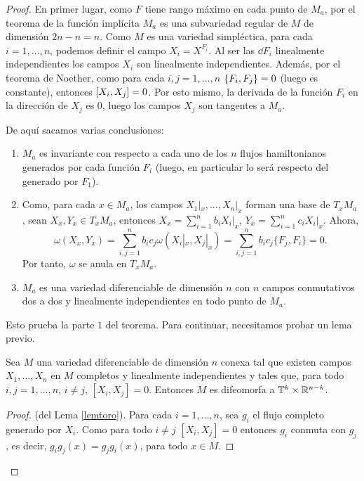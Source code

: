  \begin{proof}
  En primer lugar, como $F$ tiene rango máximo en cada punto de $M_a$, por el teorema de la función implícita $M_a$ es una subvariedad regular de $M$ de dimensión $2n-n=n$. 
  Como $M$ es una variedad simpléctica, para cada $i=1,\dots,n$, podemos definir el campo $X_i=X^{F_i}$. Al ser las $\dd F_i$ linealmente independientes los campos $X_i$ son linealmente independientes. Además, por el teorema de Noether, como para cada $i,j= 1,\dots,n$ $\left\lbrace F_i,F_j\right\rbrace=0$ (luego es constante), entonces $\left[X_i,X_j\right]=0$. Por esto mismo, la derivada de la función $F_i$ en la dirección de $X_j$ es 0, luego los campos $X_j$ son tangentes a $M_a$.

  De aquí sacamos varias conclusiones:
  \begin{enumerate}
    \item $M_a$ es invariante con respecto a cada uno de los $n$ flujos hamiltonianos generados por cada función $F_i$ (luego, en particular lo será respecto del generado por $F_1$).
    \item Como, para cada $x \in M_a$, los campos $X_1|_x,\dots, X_n|_x$ forman una base de $T_x M_a$, sean $X_x, Y_x \in T_x M_a$, entonces $X_x = \sum_{i=1}^n b_i X_i|_x$, $Y_x=\sum_{i=1}^n c_i X_i|_x$. Ahora,
      \[
	\omega(X_x,Y_x)= \sum_{i,j=1}^n b_i c_j \omega(X_i|_x,X_j|_x) = \sum_{i,j=1}^n b_i c_j \{F_j,F_i\} = 0.
      \]
      Por tanto, $\omega$ se anula en $T_x M_a$. 
    \item $M_a$ es una variedad diferenciable de dimensión $n$ con $n$ campos conmutativos dos a dos y linealmente independientes en todo punto de $M_a$. 
  \end{enumerate}

  Esto prueba la parte $1$ del teorema. Para continuar, necesitamos probar un lema previo.

  \begin{lema}\label{lemtoro}
    Sea $M$ una variedad diferenciable de dimensión $n$ conexa tal que existen campos $X_1,\dots,X_n$ en $M$ completos y linealmente independientes y tales que, para todo $i,j=1,\dots,n$, $i\neq j$, $[X_i,X_j]=0$. Entonces $M$ es difeomorfa a $\mathbb{T}^k\times \mathbb{R}^{n-k}$. 
\end{lema}
\begin{proof}(del Lema \ref{lemtoro}).
  Para cada $i=1,\dots,n$, sea $g_i$ el flujo completo generado por $X_i$. Como para todo $i\neq j$ $[X_i,X_j]=0 $ entonces $g_i$ conmuta con $g_j$, es decir, $g_ig_j (x)=g_jg_i (x)$, para todo $x \in M$. 


\end{proof}
\end{proof}
